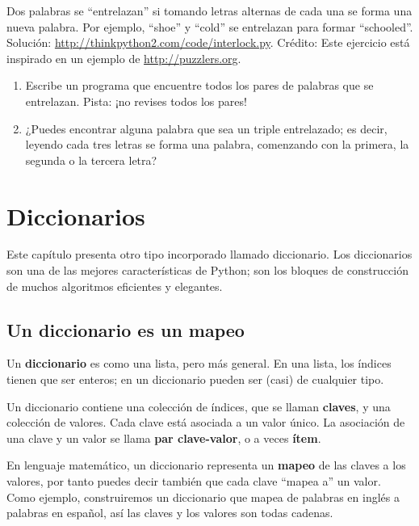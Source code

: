 \documentclass[10pt]{book}
\begin{document}
\begin{exercise}

Dos palabras se ``entrelazan'' si tomando letras alternas de cada una se forma
una nueva palabra.  Por ejemplo, ``shoe'' y ``cold''
se entrelazan para formar ``schooled''.
Solución: \url{http://thinkpython2.com/code/interlock.py}.
Crédito: Este ejercicio está inspirado en un ejemplo de \url{http://puzzlers.org}.

\begin{enumerate}

\item Escribe un programa que encuentre todos los pares de palabras que se entrelazan.
  Pista: ¡no revises todos los pares!

\item ¿Puedes encontrar alguna palabra que sea un triple entrelazado; es decir,
  leyendo cada tres letras se forma una palabra, comenzando con la primera, la segunda o
  la tercera letra?

\end{enumerate}
\end{exercise}


\chapter{Diccionarios}

Este capítulo presenta otro tipo incorporado llamado diccionario.
Los diccionarios son una de las mejores características de Python; son los
bloques de construcción de muchos algoritmos eficientes y elegantes.


\section{Un diccionario es un mapeo}

Un {\bf diccionario} es como una lista, pero más general.  En una lista,
los índices tienen que ser enteros; en un diccionario pueden ser
(casi) de cualquier tipo.

Un diccionario contiene una colección de índices, que se llaman {\bf
  claves}, y una colección de valores.  Cada clave está asociada a un
valor único.  La asociación de una clave y un valor se llama {\bf
  par clave-valor}, o a veces {\bf ítem}.  

En lenguaje matemático, un diccionario representa un {\bf mapeo}
de las claves a los valores, por tanto puedes decir también que cada clave
``mapea a'' un valor.
Como ejemplo, construiremos un diccionario que mapea de palabras en inglés
a palabras en español, así las claves y los valores son todas cadenas.
\end{document}
